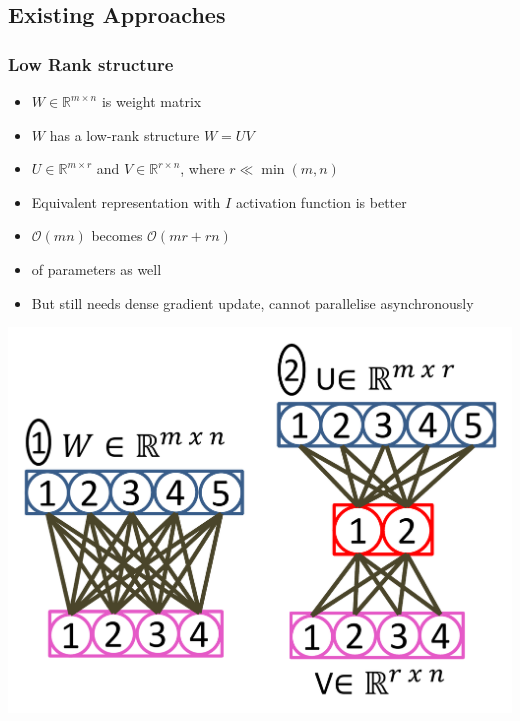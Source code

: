 \documentclass{beamer}
\begin{document}
\subsection{Existing Approaches}
\begin{frame}
    \frametitle{Low Rank structure}

    \begin{minipage}{0.6\textwidth}
        \begin{itemize}
            \item $W \in \mathbb{R}^{m\times n}$ is weight matrix
            \item $W$ has a low-rank structure $W=UV$
            \item $U\in \mathbb{R}^{m\times r}$ and $V\in \mathbb{R}^{r\times n}$, where $r \ll \min(m,n)$
            \item Equivalent representation with $I$ activation function is better
            \item $\mathcal{O}(mn)$ becomes $\mathcal{O}(mr+rn)$
            \item {} of parameters as well
            \item But still needs dense gradient update, cannot parallelise asynchronously
        \end{itemize}
    \end{minipage}\hfill
    \begin{minipage}{0.4\textwidth}
        \includegraphics[width=\textwidth]{images/Low_Rank.png}
    \end{minipage}

\end{frame}
\end{document}

